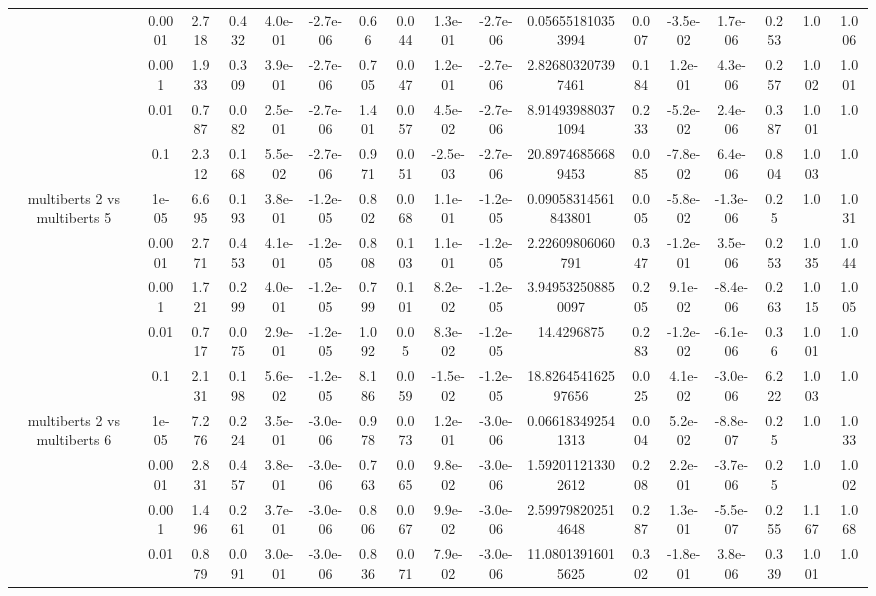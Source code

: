 \begin{tabular}{|c|c|c|c|c|c|c|c|c|c|c|c|c|c|c|c|c|}
 & 0.0001 & 2.718 & 0.432 & 4.0e-01 & -2.7e-06 & 0.66 & 0.044 & 1.3e-01 & -2.7e-06 & 0.056551810353994 & 0.007 & -3.5e-02 & 1.7e-06 & 0.253 & 1.0 & 1.006 \\
 & 0.001 & 1.933 & 0.309 & 3.9e-01 & -2.7e-06 & 0.705 & 0.047 & 1.2e-01 & -2.7e-06 & 2.826803207397461 & 0.184 & 1.2e-01 & 4.3e-06 & 0.257 & 1.002 & 1.001 \\
 & 0.01 & 0.787 & 0.082 & 2.5e-01 & -2.7e-06 & 1.401 & 0.057 & 4.5e-02 & -2.7e-06 & 8.914939880371094 & 0.233 & -5.2e-02 & 2.4e-06 & 0.387 & 1.001 & 1.0 \\
 & 0.1 & 2.312 & 0.168 & 5.5e-02 & -2.7e-06 & 0.971 & 0.051 & -2.5e-03 & -2.7e-06 & 20.89746856689453 & 0.085 & -7.8e-02 & 6.4e-06 & 0.804 & 1.003 & 1.0 \\
\hline
\multirow{5}{*}{multiberts 2 vs multiberts 5} & 1e-05 & 6.695 & 0.193 & 3.8e-01 & -1.2e-05 & 0.802 & 0.068 & 1.1e-01 & -1.2e-05 & 0.09058314561843801 & 0.005 & -5.8e-02 & -1.3e-06 & 0.25 & 1.0 & 1.031 \\
 & 0.0001 & 2.771 & 0.453 & 4.1e-01 & -1.2e-05 & 0.808 & 0.103 & 1.1e-01 & -1.2e-05 & 2.22609806060791 & 0.347 & -1.2e-01 & 3.5e-06 & 0.253 & 1.035 & 1.044 \\
 & 0.001 & 1.721 & 0.299 & 4.0e-01 & -1.2e-05 & 0.799 & 0.101 & 8.2e-02 & -1.2e-05 & 3.949532508850097 & 0.205 & 9.1e-02 & -8.4e-06 & 0.263 & 1.015 & 1.005 \\
 & 0.01 & 0.717 & 0.075 & 2.9e-01 & -1.2e-05 & 1.092 & 0.05 & 8.3e-02 & -1.2e-05 & 14.4296875 & 0.283 & -1.2e-02 & -6.1e-06 & 0.36 & 1.001 & 1.0 \\
 & 0.1 & 2.131 & 0.198 & 5.6e-02 & -1.2e-05 & 8.186 & 0.059 & -1.5e-02 & -1.2e-05 & 18.826454162597656 & 0.025 & 4.1e-02 & -3.0e-06 & 6.222 & 1.003 & 1.0 \\
\hline
\multirow{5}{*}{multiberts 2 vs multiberts 6} & 1e-05 & 7.276 & 0.224 & 3.5e-01 & -3.0e-06 & 0.978 & 0.073 & 1.2e-01 & -3.0e-06 & 0.066183492541313 & 0.004 & 5.2e-02 & -8.8e-07 & 0.25 & 1.0 & 1.033 \\
 & 0.0001 & 2.831 & 0.457 & 3.8e-01 & -3.0e-06 & 0.763 & 0.065 & 9.8e-02 & -3.0e-06 & 1.592011213302612 & 0.208 & 2.2e-01 & -3.7e-06 & 0.25 & 1.0 & 1.002 \\
 & 0.001 & 1.496 & 0.261 & 3.7e-01 & -3.0e-06 & 0.806 & 0.067 & 9.9e-02 & -3.0e-06 & 2.599798202514648 & 0.287 & 1.3e-01 & -5.5e-07 & 0.255 & 1.167 & 1.068 \\
 & 0.01 & 0.879 & 0.091 & 3.0e-01 & -3.0e-06 & 0.836 & 0.071 & 7.9e-02 & -3.0e-06 & 11.08013916015625 & 0.302 & -1.8e-01 & 3.8e-06 & 0.339 & 1.001 & 1.0 \\

\end{tabular}

